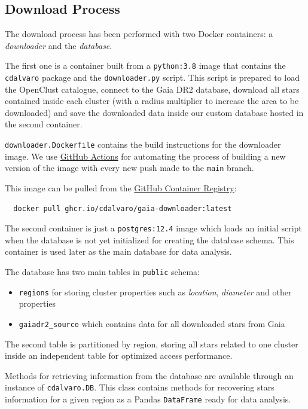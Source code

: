 \documentclass[11pt, a4paper, english]{book}
\begin{document}
\subsection{Download Process}

The download process has been performed with two Docker containers: a \emph{downloader} and the \emph{database}.

The first one is a container built from a \verb|python:3.8| image that contains the \verb|cdalvaro| package and the \verb|downloader.py| script.
This script is prepared to load the OpenClust catalogue, connect to the Gaia DR2 database, download all stars contained inside each cluster
(with a radius multiplier to increase the area to be downloaded) and save the downloaded data inside our custom database hosted in the second container.

\verb|downloader.Dockerfile| contains the build instructions for the downloader image. We use \href{https://github.com/features/actions}{GitHub Actions}
for automating the process of building a new version of the image with every new push made to the \verb|main| branch.

This image can be pulled from the \href{https://github.blog/2020-09-01-introducing-github-container-registry/}{GitHub Container Registry}:

\begin{verbatim}
  docker pull ghcr.io/cdalvaro/gaia-downloader:latest
\end{verbatim}

The second container is just a \verb|postgres:12.4| image which loads an initial script when the database is not yet initialized for creating the
database schema. This container is used later as the main database for data analysis.

The database has two main tables in \verb|public| schema:

\begin{itemize}
  \item \verb|regions| for storing cluster properties such as \emph{location}, \emph{diameter} and other properties
  \item \verb|gaiadr2_source| which contains data for all downloaded stars from Gaia
\end{itemize}

The second table is partitioned by region, storing all stars related to one cluster inside an independent table for optimized access performance.

Methods for retrieving information from the database are available through an instance of \verb|cdalvaro.DB|. This class contains methods
for recovering stars information for a given region as a Pandas \verb|DataFrame| ready for data analysis.
\end{document}

